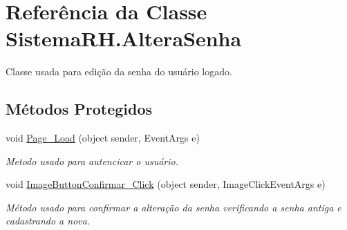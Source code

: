 \hypertarget{class_sistema_r_h_1_1_altera_senha}{
\section{Referência da Classe SistemaRH.AlteraSenha}
\label{class_sistema_r_h_1_1_altera_senha}
}


Classe usada para edição da senha do usuário logado.  


\subsection*{Métodos Protegidos}
\begin{DoxyCompactItemize}
\item 
void \hyperlink{class_sistema_r_h_1_1_altera_senha_a534ada04a0192a9822c268a054cd1fa5}{Page\_\-Load} (object sender, EventArgs e)
\begin{DoxyCompactList}\small\item\em Metodo usado para autencicar o usuário. \item\end{DoxyCompactList}\item 
void \hyperlink{class_sistema_r_h_1_1_altera_senha_ac18f9eb82e6a4f2906b7d8a321ee48e5}{ImageButtonConfirmar\_\-Click} (object sender, ImageClickEventArgs e)
\begin{DoxyCompactList}\small\item\em Método usado para confirmar a alteração da senha verificando a senha antiga e cadastrando a nova. \item\end{DoxyCompactList}\end{DoxyCompactItemize}
